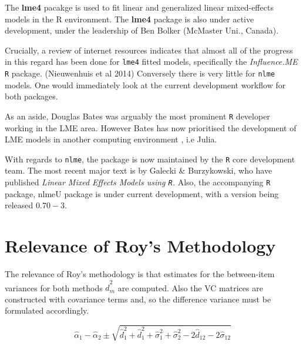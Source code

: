 \documentclass[12pt, a4paper]{report}
\theoremstyle{plain}
\theoremstyle{definition}
\theoremstyle{remark}
\begin{document}
	
	The \textbf{lme4} pacakge is used to fit linear and generalized linear mixed-effects models in the R environment.
	The \textbf{lme4} package is also under active development, under the leadership of Ben Bolker (McMaster Uni., Canada).
	
	
	Crucially, a review of internet resources indicates that almost all of the progress in this regard has been done for \texttt{lme4} fitted models, specifically the \textit{Influence.ME} \texttt{R} package. (Nieuwenhuis et al 2014)
	Conversely there is very little for \texttt{nlme} models. One would immediately look at the current development workflow for both packages.
	
	
	As an aside, Douglas Bates was arguably the most prominent \texttt{R} developer working in the LME area. 
	However Bates has now prioritised the development of LME models in another computing environment , i.e Julia. 
	
	
	With regards to \texttt{nlme}, the package is now maintained by the \texttt{R} core development team. The most recent major text is by Galecki \& Burzykowski, who have published \textit{ Linear Mixed Effects Models using \texttt{R}. }
	Also, the accompanying \texttt{R} package, nlmeU package is under current development, with a version being released $0.70-3$.
	
	
	












\section{Relevance of Roy's Methodology}

The relevance of Roy's methodology is that estimates for the between-item variances for both methods $\hat{d}^2_m$ are computed. Also the VC matrices are constructed with covariance
terms and, so the difference variance must be formulated accordingly.


\[
\hat{\alpha}_1 - \hat{\alpha}_2 \pm \sqrt{ \hat{d}^2_1  +
	\hat{d}^2_1 + \hat{\sigma}^2_1 + \hat{\sigma}^2_2 - 2 \hat{d}_{12}
	- 2 \hat{\sigma}_12}
\]
\end{document}
